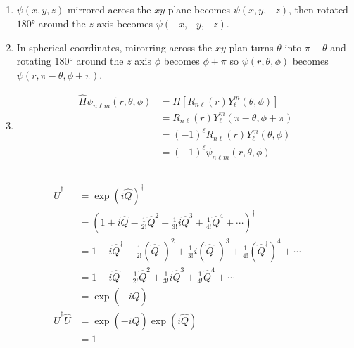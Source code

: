 \documentclass{article}
\begin{document}
\subsection{}

\begin{enumerate}
  \item $\psi(x, y, z)$ mirrored across the $xy$ plane becomes $\psi(x, y, -z)$, then rotated $\ang{180}$ around the $z$ axis becomes $\psi(-x, -y, -z)$.

  \item In spherical coordinates, mirorring across the $xy$ plan turns $\theta$ into $\pi - \theta$ and rotating $\ang{180}$ around the $z$ axis $\phi$ becomes $\phi + \pi$ so $\psi(r, \theta, \phi)$ becomes $\psi(r, \pi - \theta, \phi + \pi)$.

  \item

        \begin{align*}
          \hat{\Pi} \psi_{n \ell m}(r, \theta, \phi) & = \hat{\Pi} [R_{n \ell}(r) Y_\ell^m(\theta, \phi)] \\
                                                     & = R_{n \ell}(r) Y_\ell^m(\pi - \theta, \phi + \pi) \\
                                                     & = (-1)^\ell R_{n \ell}(r) Y_\ell^m(\theta, \phi)   \\
                                                     & = (-1)^\ell \psi_{n \ell m}(r, \theta, \phi)
        \end{align*}
\end{enumerate}

\subsection{}

\begin{align*}
  \hat{U}^\dagger         & = \exp (i \hat{Q})^\dagger                                                                                                                  \\
                          & = \left( 1 + i \hat{Q} - \frac{1}{2!} \hat{Q}^2 - \frac{1}{3!} i \hat{Q}^3 + \frac{1}{4!} \hat{Q}^4 + \cdots \right)^\dagger                \\
                          & = 1 - i \hat{Q}^\dagger - \frac{1}{2!} (\hat{Q}^\dagger)^2 + \frac{1}{3!} i (\hat{Q}^\dagger)^3 + \frac{1}{4!} (\hat{Q}^\dagger)^4 + \cdots \\
                          & = 1 - i \hat{Q} - \frac{1}{2!} \hat{Q}^2 + \frac{1}{3!} i \hat{Q}^3 + \frac{1}{4!} \hat{Q}^4 + \cdots                                       \\
                          & = \exp (-i \hat{Q})                                                                                                                         \\
  \hat{U}^\dagger \hat{U} & = \exp (-i \hat{Q}) \exp(i \hat{Q})                                                                                                         \\
                          & = 1
\end{align*}
\end{document}
